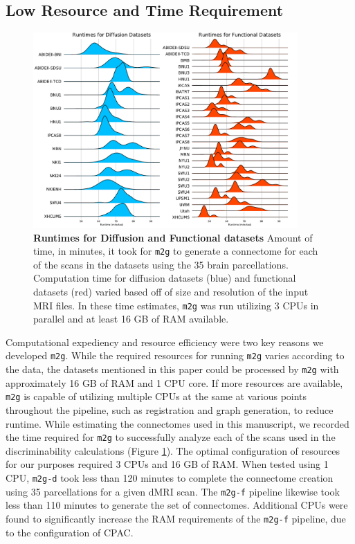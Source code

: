\subsection{Low Resource and Time Requirement}
\begin{figure}%
	\centering
    \includegraphics[width=0.9\textwidth]{figures/m2g/seperated_joyplot.pdf}
    \caption{\textbf{Runtimes for Diffusion and Functional datasets}
    Amount of time, in minutes, it took for \texttt{m2g} to generate a connectome for each of the scans in the datasets using the 35 brain parcellations. Computation time for diffusion datasets (blue) and functional datasets (red) varied based off of size and resolution of the input MRI files. In these time estimates, \texttt{m2g} was run utilizing 3 CPUs in parallel and at least 16 GB of RAM available.
    }
	\label{fig:runtime}
\end{figure}
Computational expediency and resource efficiency were two key reasons we developed \texttt{m2g}. While the required resources for running \texttt{m2g} varies according to the data, the datasets mentioned in this paper could be processed by \texttt{m2g} with approximately 16 GB of RAM and 1 CPU core. If more resources are available, \texttt{m2g} is capable of utilizing multiple CPUs at the same at various points throughout the pipeline, such as registration and graph generation, to reduce runtime. While estimating the connectomes used in this manuscript, we recorded the time required for \texttt{m2g} to successfully analyze each of the scans used in the discriminability calculations (Figure \ref{fig:runtime}). The optimal configuration of resources for our purposes required 3 CPUs and 16 GB of RAM. When tested using 1 CPU, \texttt{m2g-d} took less than 120 minutes to complete the connectome creation using 35 parcellations for a given dMRI scan. The \texttt{m2g-f} pipeline likewise took less than 110 minutes to generate the set of connectomes. Additional CPUs were found to significantly increase the RAM requirements of the \texttt{m2g-f} pipeline, due to the configuration of CPAC.

